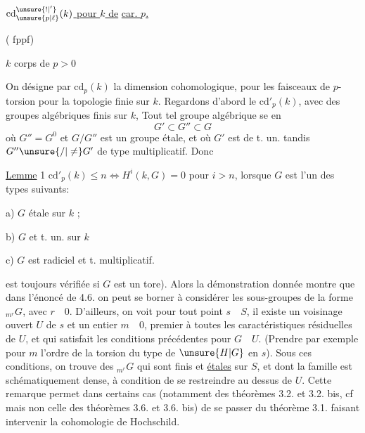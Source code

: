 \uline{$\mathrm{cd}^{\unsure{!|'}}_{\unsure{p|\ell}}(k)$ pour $k$ de}
\uline{car. $p$.}

( fppf)


$k$ corps de  $p>0$

On désigne par $\mathrm{cd}_p(k)$ la dimension cohomologique,
 pour les faisceaux de $p$-torsion pour la
topologie finie   sur $k$. Regardons d'abord
le $\mathrm{cd}'_p(k)$,  avec des groupes algébriques
 finis sur $k$,  Tout tel groupe algébrique se 
en
\[
G'\subset G''\subset G
\]
où $G''=G^0$ et $G/G''$ est un groupe
étale, et où $G'$ est  de t. un. tandis
$G''\unsure{/|\ne}G'$  de type multiplicatif. Donc

\uline{Lemme} 1 $\mathrm{cd}'_p(k)\leq n\Longleftrightarrow H^i(k,G)=0$ pour $i>n$,
lorsque $G$ est  l'un des types suivants:

a) $G$ étale sur $k$ ; 

b) $G$  et t. un. sur $k$

c) $G$ est radiciel et t. multiplicatif.


est toujours vérifiée si $G$ est un tore). Alors la démonstration donnée
montre que dans l'énoncé de 4.6.  on peut se borner à considérer les
sous-groupes de la forme ${}_{m^r}G$, avec $r\quad 0$. D'ailleurs, on voit 
  pour tout point $s\quad S$, il existe un voisinage ouvert $U$ de $s$ 
et un entier $m\quad 0$, premier à toutes les caractéristiques 
résiduelles de $U$, et qui satisfait les conditions précédentes pour $G\quad U$.
(Prendre par exemple pour $m$ l'ordre de la torsion du type de $\unsure{H|G}$ 
en $s$). Sous ces conditions, on trouve des ${}_{m^r}G$ qui sont finis et
\uline{étales} sur $S$, et dont la famille est schématiquement dense, à condition
de se restreindre au dessus de $U$. Cette remarque permet dans certains
cas (notamment   des théorèmes 3.2. et 3.2. bis, cf
mais non celle des théorèmes 3.6. et 3.6. bis) de se passer du théorème 3.1. faisant intervenir la cohomologie de Hochschild. 

